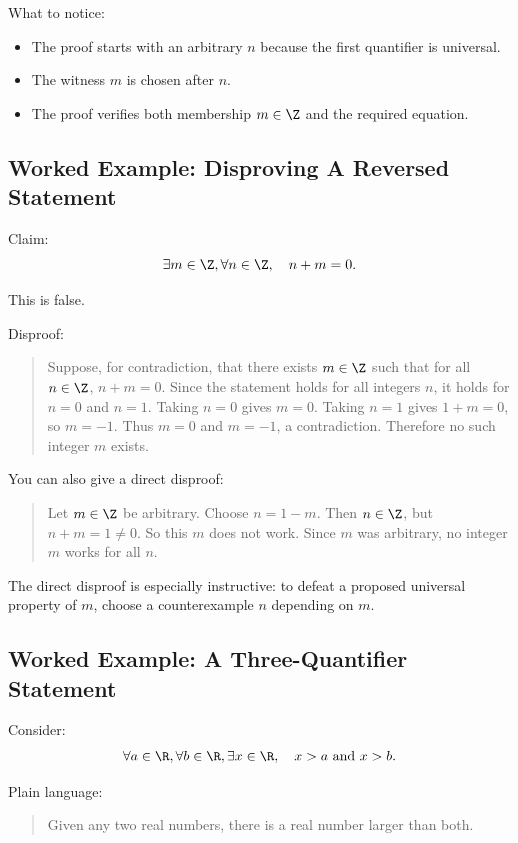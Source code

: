 What to notice:

\begin{itemize}
\item The proof starts with an arbitrary $n$ because the first quantifier is universal.
\item The witness $m$ is chosen after $n$.
\item The proof verifies both membership $m\in\Z$ and the required equation.
\end{itemize}

\subsection{Worked Example: Disproving A Reversed Statement}

Claim:
\[
\exists m\in\Z,\forall n\in\Z,\quad n+m=0.
\]

This is false.

Disproof:

\begin{quote}
Suppose, for contradiction, that there exists $m\in\Z$ such that for all $n\in\Z$, $n+m=0$. Since the statement holds for all integers $n$, it holds for $n=0$ and $n=1$. Taking $n=0$ gives $m=0$. Taking $n=1$ gives $1+m=0$, so $m=-1$. Thus $m=0$ and $m=-1$, a contradiction. Therefore no such integer $m$ exists.
\end{quote}

You can also give a direct disproof:

\begin{quote}
Let $m\in\Z$ be arbitrary. Choose $n=1-m$. Then $n\in\Z$, but $n+m=1\neq0$. So this $m$ does not work. Since $m$ was arbitrary, no integer $m$ works for all $n$.
\end{quote}

The direct disproof is especially instructive: to defeat a proposed universal property of $m$, choose a counterexample $n$ depending on $m$.

\subsection{Worked Example: A Three-Quantifier Statement}

Consider:
\[
\forall a\in\R,\forall b\in\R,\exists x\in\R,\quad x>a\text{ and }x>b.
\]

Plain language:

\begin{quote}
Given any two real numbers, there is a real number larger than both.
\end{quote}

